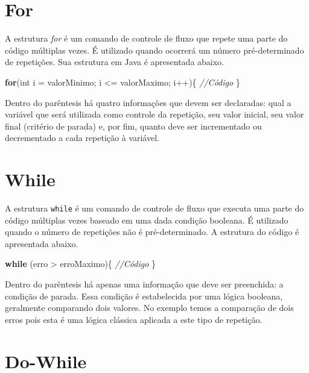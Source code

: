 \documentclass[
]{book}
\newenvironment{Shaded}{\begin{snugshade}}{\end{snugshade}}
\newcommand{\CommentTok}[1]{\textcolor[rgb]{0.56,0.35,0.01}{\textit{#1}}}
\newcommand{\DataTypeTok}[1]{\textcolor[rgb]{0.13,0.29,0.53}{#1}}
\newcommand{\KeywordTok}[1]{\textcolor[rgb]{0.13,0.29,0.53}{\textbf{#1}}}
\newcommand{\NormalTok}[1]{#1}
\begin{document}
\hypertarget{for}{%
\section{For}\label{for}}

A estrutura \emph{for} é um comando de controle de fluxo que repete uma parte do código múltiplas vezes. É utilizado quando ocorrerá um número pré-determinado de repetições. Sua estrutura em Java é apresentada abaixo.

\begin{Shaded}
\begin{Highlighting}[]
\KeywordTok{for}\NormalTok{(}\DataTypeTok{int}\NormalTok{ i = valorMinimo; i <= valorMaximo; i++)\{}
    \CommentTok{//Código}
\NormalTok{\}}
\end{Highlighting}
\end{Shaded}

Dentro do parêntesis há quatro informações que devem ser declaradas: qual a variável que será utilizada como controle da repetição, seu valor inicial, seu valor final (critério de parada) e, por fim, quanto deve ser incrementado ou decrementado a cada repetição à variável.

\hypertarget{while}{%
\section{While}\label{while}}

A estrutura \texttt{while} é um comando de controle de fluxo que executa uma parte do código múltiplas vezes baseado em uma dada condição booleana. É utilizado quando o número de repetições não é pré-determinado. A estrutura do código é apresentada abaixo.

\begin{Shaded}
\begin{Highlighting}[]
\KeywordTok{while}\NormalTok{ (erro > erroMaximo)\{}
    \CommentTok{//Código}
\NormalTok{\}}
\end{Highlighting}
\end{Shaded}

Dentro do parêntesis há apenas uma informação que deve ser preenchida: a condição de parada. Essa condição é estabelecida por uma lógica booleana, geralmente comparando dois valores. No exemplo temos a comparação de dois erros pois esta é uma lógica clássica aplicada a este tipo de repetição.

\hypertarget{do-while}{%
\section{Do-While}\label{do-while}}
\end{document}

